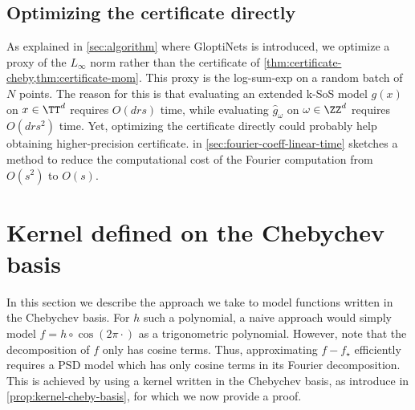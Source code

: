 \documentclass{article}
\begin{document}
\subsection{Optimizing the certificate directly}
\label{sec:optimizing-certificate}

As explained in \cref{sec:algorithm} where GloptiNets is introduced, we optimize a proxy of the $L_\infty$ norm rather than the certificate of \cref{thm:certificate-cheby,thm:certificate-mom}. This proxy is the log-sum-exp on a random batch of $N$ points. The reason for this is that evaluating an extended k-SoS model $g(x)$ on $x \in \TT^d$ requires $O(d r s)$ time, while evaluating $\hat{g}_\omega$ on $\omega \in \ZZ^d$ requires $O(d r s^2)$ time. Yet, optimizing the certificate directly could probably help obtaining higher-precision certificate.  in \cref{sec:fourier-coeff-linear-time} sketches a method to reduce the computational cost of the Fourier computation from $O(s^2)$ to $O(s)$.

\section{Kernel defined on the Chebychev basis}
\label{sec:cheby-kernels}

In this section we describe the approach we take to model functions written in the Chebychev basis. For $h$ such a polynomial, a naive approach would simply model $f = h \circ \cos (2\pi \cdot)$ as a trigonometric polynomial. However, note that the decomposition of $f$ only has cosine terms. Thus, approximating $f - f_\star$ efficiently requires a PSD model which has only cosine terms in its Fourier decomposition. This is achieved by using a kernel written in the Chebychev basis, as introduce in \cref{prop:kernel-cheby-basis}, for which we now provide a proof.
\end{document}
